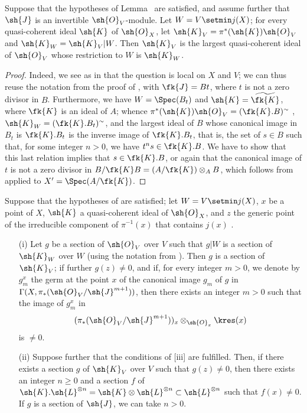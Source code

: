 \begin{corollary}[8.10.4]
\label{II.8.10.4}
Suppose that the hypotheses of Lemma~ are satisfied, and assume further that $\sh{J}$ is an invertible $\sh{O}_V$-module.
Let $W=V\setmin j(X)$;
for every quasi-coherent ideal $\sh{K}$ of $\sh{O}_X$, let $\sh{K}_V=\pi^*(\sh{K})\sh{O}_V$ and $\sh{K}_W=\sh{K}_V|W$.
Then $\sh{K}_V$ is the largest quasi-coherent ideal of $\sh{O}_V$ whose restriction to $W$ is $\sh{K}_W$.
\end{corollary}

\begin{proof}
\label{proof-II.8.10.4}
Indeed, we see as in  that the question is local on $X$ and $V$;
we can thus reuse the notation from the proof of , with $\fk{J}=Bt$, where $t$ is not a zero divisor in $B$.
Furthermore, we have $W=\Spec(B_t)$ and $\sh{K}=\widetilde{\fk{K}}$, where $\fk{K}$ is an ideal of $A$;
whence $\pi^*(\sh{K})\sh{O}_V=(\fk{K}.B)^\sim$ , $\sh{K}_W=(\fk{K}.B_t)^\sim$, and the largest ideal
of $B$ whose canonical image in $B_t$ is $\fk{K}.B_t$ is the inverse image of $\fk{K}.B_t$, that is, the set of $s\in B$ such that, for some integer $n>0$, we have $t^ns\in\fk{K}.B$.
We have to show that this last relation implies that $s\in\fk{K}.B$, or again that the canonical image of $t$ is not a zero divisor in $B/\fk{K}B=(A/\fk{K})\otimes_AB$, which follows from  applied to $X'=\Spec(A/\fk{K})$.
\end{proof}

\begin{corollary}[8.10.5]
\label{II.8.10.5}
Suppose that the hypotheses of  are satisfied;
let $W=V\setmin j(X)$, $x$ be a point of $X$, $\sh{K}$ a quasi-coherent ideal of $\sh{O}_X$, and $z$ the generic point of the irreducible component of $\pi^{-1}(x)$ that contains $j(x)$ .
\begin{enumerate}
    \item[\rm{(i)}] Let $g$ be a section of $\sh{O}_V$ over $V$ such that $g|W$ is a section of $\sh{K}_W$ over $W$ (using the notation from ).
        Then $g$ is a section of $\sh{K}_V$;
        if further $g(z)\neq0$, and if, for every integer $m>0$, we denote by $g_m^x$ the germ at the point $x$ of the canonical image $g_m$ of $g$ in $\Gamma(X,\pi_*(\sh{O}_V/\sh{J}^{m+1}))$, then there exists an integer $m>0$ such that the image of $g_m^x$ in
        \[
            (\pi_*(\sh{O}_V/\sh{J}^{m+1}))_x \otimes_{\sh{O}_x} \kres(x)
        \]
        is $\neq0$.
    \item[\rm{(ii)}] Suppose further that the conditions of [iii] are fulfilled.
        Then, if there exists a section $g$ of $\sh{K}_V$ over $V$ such that $g(z)\neq0$, then there exists an integer $n\geq0$ and a section $f$ of $\sh{K}.\sh{L}^{\otimes n}=\sh{K}\otimes\sh{L}^{\otimes n}\subset\sh{L}^{\otimes n}$ such that $f(x)\neq0$.
        If $g$ is a section of $\sh{J}$, we can take $n>0$.
\end{enumerate}
\end{corollary}

